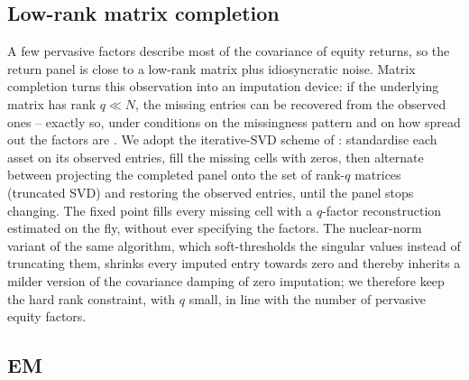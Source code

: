 \subsection{Low-rank matrix completion}

A few pervasive factors describe most of the covariance of equity returns,
so the return panel is close to a low-rank matrix plus idiosyncratic noise.
Matrix completion turns this observation into an imputation device: if the
underlying matrix has rank $q \ll N$, the missing entries can be recovered
from the observed ones -- exactly so, under conditions on the missingness
pattern and on how spread out the factors are \citep{candes2009}. We adopt
the iterative-SVD scheme of \citet{mazumder2010}: standardise each asset on
its observed entries, fill the missing cells with zeros, then alternate
between projecting the completed panel onto the set of rank-$q$ matrices
(truncated SVD) and restoring the observed entries, until the panel stops
changing. The fixed point fills every missing cell with a $q$-factor
reconstruction estimated on the fly, without ever specifying the factors.
The nuclear-norm variant of the same algorithm, which soft-thresholds the
singular values instead of truncating them, shrinks every imputed entry
towards zero and thereby inherits a milder version of the covariance damping
of zero imputation; we therefore keep the hard rank constraint, with $q$
small, in line with the number of pervasive equity factors.

\subsection{EM}

